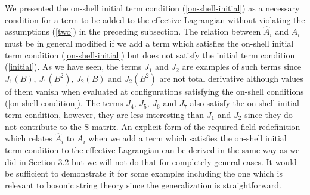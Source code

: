 \documentclass[a4paper,12pt]{article}
\begin{document}
We presented the on-shell initial term condition
(\ref{on-shell-initial}) as a necessary condition
for a term to be added to the effective Lagrangian
without violating the assumptions (\ref{two})
in the preceding subsection.
The relation between $\hat{A}_i$ and $A_i$
must be in general modified
if we add a term which satisfies the on-shell
initial term condition (\ref{on-shell-initial}) but does not
satisfy the initial term condition (\ref{initial}).
As we have seen, the terms $J_1$ and $J_2$
are examples of such terms
since $J_1 (B)$, $J_1 (B^2)$, $J_2 (B)$ and $J_2 (B^2)$
are not total derivative although values of them vanish
when evaluated at configurations satisfying the on-shell
conditions (\ref{on-shell-condition}).
The terms $J_4$, $J_5$, $J_6$ and $J_7$
also satisfy the on-shell initial
term condition, however, they are less interesting than $J_1$ and
$J_2$ since they do not contribute to the S-matrix.
An explicit form of the required field redefinition
which relates $\hat{A}_i$ to $A_i$ when we add a term
which satisfies the on-shell initial term condition
to the effective Lagrangian
can be derived in the same way as we did in Section 3.2
but we will not do that for completely general cases.
It would be sufficient to demonstrate it for some examples
including the one which is relevant to bosonic string theory
since the generalization is straightforward.
\end{document}
